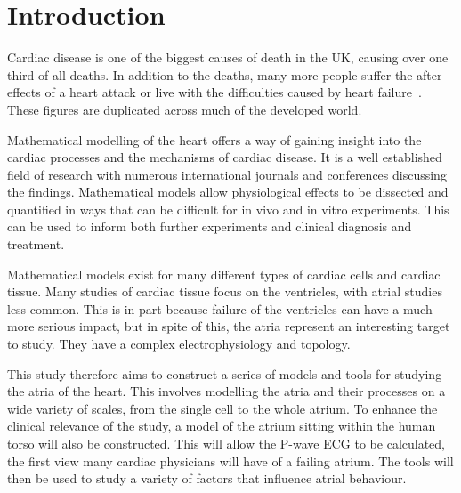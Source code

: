 \chapter{Introduction}

Cardiac disease is one of the biggest causes of death in the UK, causing over
one third of all deaths.
In addition to the deaths, many more people suffer the after effects of a heart
attack or live with the difficulties caused by heart failure~\cite{bhf2008}.
These figures are duplicated across much of the developed world.

Mathematical modelling of the heart offers a way of gaining insight into the
cardiac processes and the mechanisms of cardiac disease.
It is a well established field of research with numerous international journals
and conferences discussing the findings.
Mathematical models allow physiological effects to be dissected and quantified
in ways that can be difficult for in vivo and in vitro experiments.
This can be used to inform both further experiments and clinical diagnosis and
treatment.

Mathematical models exist for many different types of cardiac cells and
cardiac tissue.
Many studies of cardiac tissue focus on the ventricles, with atrial studies less
common.
This is in part because failure of the ventricles can have a much more serious
impact, but in spite of this, the atria represent an interesting target to
study.
They have a complex electrophysiology and topology.

This study therefore aims to construct a series of models and tools for studying
the atria of the heart.
This involves modelling the atria and their processes on a wide variety of scales,
from the single cell to the whole atrium.
To enhance the clinical relevance of the study, a model of the atrium sitting
within the human torso will also be constructed.
This will allow the P-wave ECG to be calculated, the first view many cardiac
physicians will have of a failing atrium.
The tools will then be used to study a variety of factors that influence atrial
behaviour.







